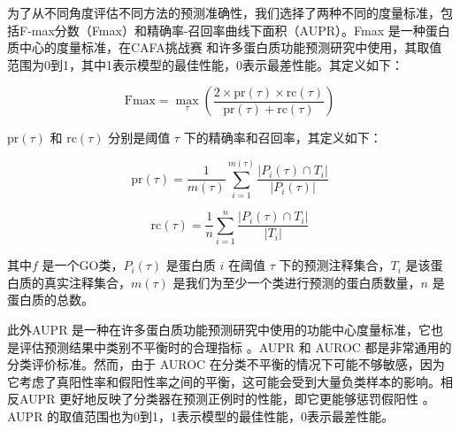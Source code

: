为了从不同角度评估不同方法的预测准确性，我们选择了两种不同的度量标准，包括F-max分数（Fmax）和精确率-召回率曲线下面积（AUPR）。Fmax \cite{clark2013information} 是一种蛋白质中心的度量标准，在CAFA挑战赛 \cite{radivojac2013large} 和许多蛋白质功能预测研究中使用，其取值范围为0到1，其中1表示模型的最佳性能，0表示最差性能。其定义如下：

\begin{equation}
\text{Fmax} = \max_{\tau} \left(\frac{2 \times \text{pr}(\tau) \times \text{rc}(\tau)}{\text{pr}(\tau) + \text{rc}(\tau)}\right)
\end{equation}

$\text{pr}(\tau)$ 和 $\text{rc}(\tau)$ 分别是阈值 $\tau$ 下的精确率和召回率，其定义如下：

\begin{equation}
\text{pr}(\tau) = \frac{1}{m(\tau)} \sum_{i=1}^{m(\tau)} \frac{\left|P_i(\tau) \cap T_i\right|}{\left|P_i(\tau)\right|}
\end{equation}

\begin{equation}
\text{rc}(\tau) = \frac{1}{n} \sum_{i=1}^{n} \frac{\left|P_i(\tau) \cap T_i\right|}{\left|T_i\right|}
\end{equation}

其中$f$ 是一个GO类，$P_i(\tau)$ 是蛋白质 $i$ 在阈值 $\tau$ 下的预测注释集合，$T_i$ 是该蛋白质的真实注释集合，$m(\tau)$ 是我们为至少一个类进行预测的蛋白质数量，$n$ 是蛋白质的总数。

此外AUPR 是一种在许多蛋白质功能预测研究中使用的功能中心度量标准，它也是评估预测结果中类别不平衡时的合理指标 \cite{davis2006relationship}。AUPR 和 AUROC 都是非常通用的分类评价标准。然而，由于 AUROC 在分类不平衡的情况下可能不够敏感，因为它考虑了真阳性率和假阳性率之间的平衡，这可能会受到大量负类样本的影响。相反AUPR 更好地反映了分类器在预测正例时的性能，即它更能够惩罚假阳性 \cite{song2024deepss2go}。AUPR 的取值范围也为0到1，1表示模型的最佳性能，0表示最差性能。



